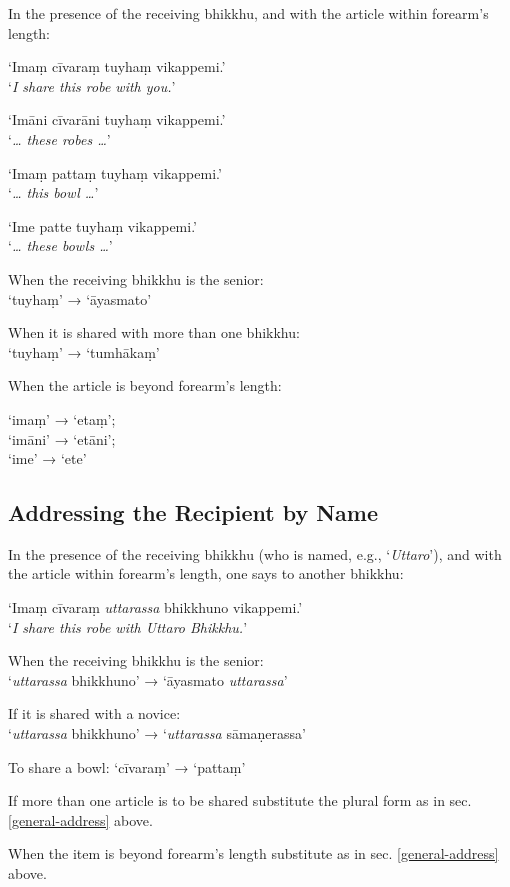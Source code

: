 In the presence of the receiving bhikkhu, and with the article within forearm's length:

‘Imaṃ cīvaraṃ tuyhaṃ vikappemi.’\\
‘\emph{I share this robe with you.}’

‘Imāni cīvarāni tuyhaṃ vikappemi.’\\
‘\emph{\ldots{} these robes \ldots{}}’

‘Imaṃ pattaṃ tuyhaṃ vikappemi.’\\
‘\emph{\ldots{} this bowl \ldots{}}’

‘Ime patte tuyhaṃ vikappemi.’\\
‘\emph{\ldots{} these bowls \ldots{}}’

When the receiving bhikkhu is the senior:\\
‘tuyhaṃ’ → ‘āyasmato’

When it is shared with more than one bhikkhu:\\
‘tuyhaṃ’ → ‘tumhākaṃ’

When the article is beyond forearm's length:

‘imaṃ’ → ‘etaṃ’;\\
‘imāni’ → ‘etāni’;\\
‘ime’ → ‘ete’ 

\subsection{Addressing the Recipient by Name}

In the presence of the receiving bhikkhu (who is named, e.g., ‘\emph{Uttaro}’),
and with the article within forearm's length, one says to another bhikkhu:

‘Imaṃ cīvaraṃ \emph{uttarassa} bhikkhuno vikappemi.’\\
‘\emph{I share this robe with Uttaro Bhikkhu.}’

When the receiving bhikkhu is the senior:\\
‘\emph{uttarassa} bhikkhuno’ → ‘āyasmato \emph{uttarassa}’

If it is shared with a novice:\\
‘\emph{uttarassa} bhikkhuno’ → ‘\emph{uttarassa} sāmaṇerassa’

To share a bowl: ‘cīvaraṃ’ → ‘pattaṃ’

If more than one article is to be shared substitute the plural form as in sec. \ref{general-address} above.

When the item is beyond forearm's length substitute as in sec. \ref{general-address} above.

